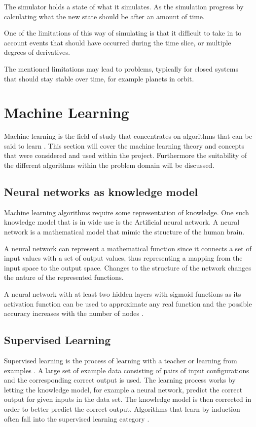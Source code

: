 The simulator holds a state of what it simulates. As the simulation progress by calculating what the new state should be after an amount of time. 

One of the limitations of this way of simulating is that it difficult to take in to account events that should have occurred during the time slice, or multiple degrees of derivatives. 

The mentioned limitations may lead to problems, typically for closed systems that should stay stable over time, for example planets in orbit. 


\section{Machine Learning}
Machine learning is the field of study that concentrates on algorithms that can be said to learn \cite{glossary}. This section will cover the machine learning theory and concepts that were considered and used within the project. Furthermore the suitability of the different algorithms within the problem domain will be discussed.  

\subsection{Neural networks as knowledge model}
Machine learning algorithms require some representation of knowledge. One such knowledge model that is in wide use is the Artificial neural network. A neural network is a mathematical model that mimic the structure of the human brain. 

A neural network can represent a mathematical function since it connects a set of input values with a set of output values, thus representing a mapping from the input space to the output space. Changes to the structure of the network changes the nature of the represented functions. 

A neural network with at least two hidden layers with sigmoid functions as its activation function can be used to approximate any real function and the possible accuracy increases with the number of nodes \cite{mitchel:approximation}.

\subsection{Supervised Learning}
Supervised learning is the process of learning with a teacher or learning from examples \cite{haykin:supervised}. A large set of example data consisting of pairs of input configurations and the corresponding correct output is used. The learning process works by letting the knowledge model, for example a neural network, predict the correct output for given inputs in the data set. The knowledge model is then corrected in order to better predict the correct output. Algorithms that learn by induction often fall into the supervised learning category \cite{glossary}. 


